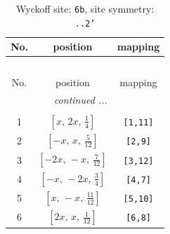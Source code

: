 \documentclass[fleqn,8pt]{jsarticle}
\begin{document}
\begin{longtable}{ccc}
\caption{Wyckoff site: {\tt 6b}, site symmetry: {\tt ..2'}}
 \\
 \hline \hline
No. & position & mapping \\ \hline \endfirsthead

\multicolumn{2}{l}{\tablename\ \thetable{}} \\
 \hline \hline
No. & position & mapping \\ \hline \endhead

 \hline \hline
\multicolumn{2}{r}{\footnotesize\it continued ...} \\ \endfoot

 \hline \hline
\multicolumn{2}{r}{} \\ \endlastfoot

1 & $\left[ x,\, 2 x,\, \frac{1}{4} \right]$ & {\tt [1,11]} \\ \hline
2 & $\left[ - x,\, x,\, \frac{5}{12} \right]$ & {\tt [2,9]} \\ \hline
3 & $\left[ - 2 x,\, - x,\, \frac{7}{12} \right]$ & {\tt [3,12]} \\ \hline
4 & $\left[ - x,\, - 2 x,\, \frac{3}{4} \right]$ & {\tt [4,7]} \\ \hline
5 & $\left[ x,\, - x,\, \frac{11}{12} \right]$ & {\tt [5,10]} \\ \hline
6 & $\left[ 2 x,\, x,\, \frac{1}{12} \right]$ & {\tt [6,8]} \\
\end{longtable}
\renewcommand{\arraystretch}{1.2}
\end{document}
